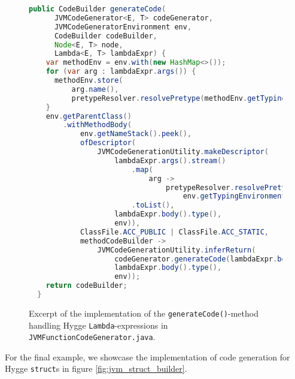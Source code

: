 \begin{figure}[H]
 \centering 
 \begin{lstlisting}[language=Java]
  public CodeBuilder generateCode(
      JVMCodeGenerator<E, T> codeGenerator,
      JVMCodeGeneratorEnvironment env,
      CodeBuilder codeBuilder,
      Node<E, T> node,
      Lambda<E, T> lambdaExpr) {
    var methodEnv = env.with(new HashMap<>());
    for (var arg : lambdaExpr.args()) {
      methodEnv.store(
          arg.name(),
          pretypeResolver.resolvePretype(methodEnv.getTypingEnvironment(), arg.preType()));
    }
    env.getParentClass()
        .withMethodBody(
            env.getNameStack().peek(),
            ofDescriptor(
                JVMCodeGenerationUtility.makeDescriptor(
                    lambdaExpr.args().stream()
                        .map(
                            arg ->
                                pretypeResolver.resolvePretype(
                                    env.getTypingEnvironment(), arg.preType()))
                        .toList(),
                    lambdaExpr.body().type(),
                    env)),
            ClassFile.ACC_PUBLIC | ClassFile.ACC_STATIC,
            methodCodeBuilder ->
                JVMCodeGenerationUtility.inferReturn(
                    codeGenerator.generateCode(lambdaExpr.body(), methodEnv, methodCodeBuilder),
                    lambdaExpr.body().type(),
                    env));
    return codeBuilder;
  }
 \end{lstlisting}
 \caption{Excerpt of the implementation of the \texttt{generateCode()}-method handling Hygge \texttt{Lambda}-expressions in \texttt{JVMFunctionCodeGenerator.java}.}
 \label{fig:jvm_function_builder}
\end{figure}

For the final example, we showcase the implementation of code generation for Hygge \texttt{struct}s in figure \ref{fig:jvm_struct_builder}.

